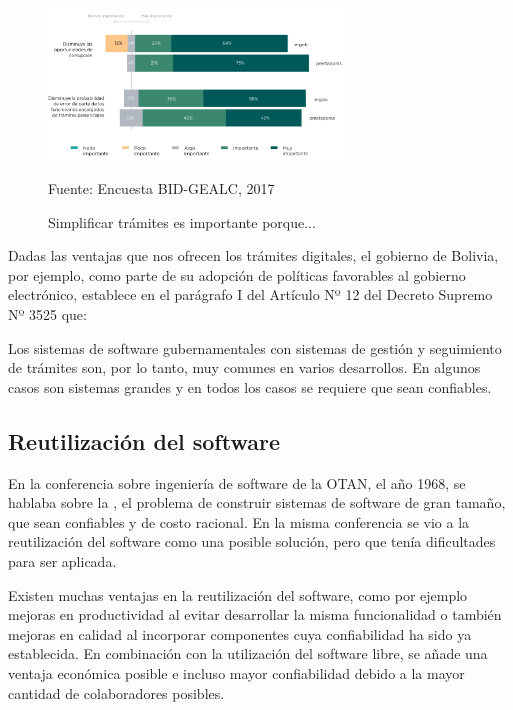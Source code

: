 \begin{figure}[!hbpt]
	\centering
	\includegraphics[width=0.7\textwidth]{assets/tramdig_importa}
	\caption{Simplificar trámites es importante porque...}{Fuente: Encuesta BID-GEALC, 2017}
	\label{fig:tramdig_importa}
\end{figure}

Dadas las ventajas que nos ofrecen los trámites digitales, el gobierno de Bolivia, por ejemplo, como parte de su adopción de políticas favorables al gobierno electrónico, 
establece en el parágrafo I del Artículo Nº 12 del Decreto Supremo Nº 3525\cite{DECRETOSUPREMO35252018} que: 

Los sistemas de software gubernamentales con sistemas de gestión y seguimiento de trámites son, por lo tanto, muy comunes en varios desarrollos. 
En algunos casos son sistemas grandes y en todos los casos se requiere que sean confiables.

\subsection{Reutilización del software}

En la conferencia sobre ingeniería de software de la OTAN, el año 1968, se hablaba sobre la , 
el problema de construir sistemas de software de gran tamaño, que sean confiables y de costo racional.
En la misma conferencia se vio a la reutilización del software como una posible solución, pero que tenía dificultades para ser aplicada\cite{kruegerSoftwareReuse1992}.

Existen muchas ventajas en la reutilización del software, 
como por ejemplo mejoras en productividad al evitar desarrollar la misma funcionalidad o también 
mejoras en calidad al incorporar componentes cuya confiabilidad ha sido ya establecida\cite{selbyEnablingReusebasedSoftware2005}. 
En combinación con la utilización del software libre, se añade una ventaja económica posible e incluso mayor confiabilidad debido a la mayor cantidad de colaboradores posibles.

